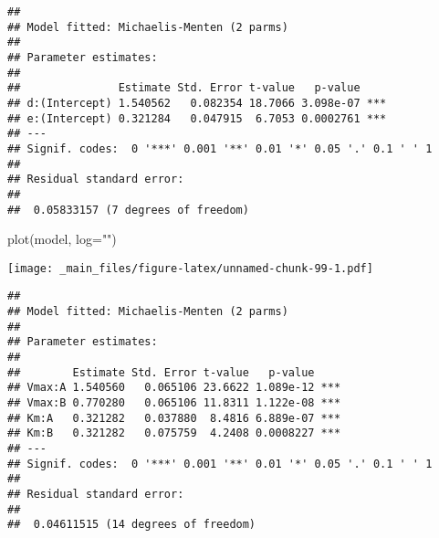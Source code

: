 \documentclass[
]{book}
\newenvironment{Shaded}{\begin{snugshade}}{\end{snugshade}}
\newcommand{\AttributeTok}[1]{\textcolor[rgb]{0.77,0.63,0.00}{#1}}
\newcommand{\CommentTok}[1]{\textcolor[rgb]{0.56,0.35,0.01}{\textit{#1}}}
\newcommand{\DecValTok}[1]{\textcolor[rgb]{0.00,0.00,0.81}{#1}}
\newcommand{\FunctionTok}[1]{\textcolor[rgb]{0.00,0.00,0.00}{#1}}
\newcommand{\NormalTok}[1]{#1}
\newcommand{\OtherTok}[1]{\textcolor[rgb]{0.56,0.35,0.01}{#1}}
\newcommand{\SpecialCharTok}[1]{\textcolor[rgb]{0.00,0.00,0.00}{#1}}
\newcommand{\StringTok}[1]{\textcolor[rgb]{0.31,0.60,0.02}{#1}}
\begin{document}
\begin{verbatim}
## 
## Model fitted: Michaelis-Menten (2 parms)
## 
## Parameter estimates:
## 
##               Estimate Std. Error t-value   p-value    
## d:(Intercept) 1.540562   0.082354 18.7066 3.098e-07 ***
## e:(Intercept) 0.321284   0.047915  6.7053 0.0002761 ***
## ---
## Signif. codes:  0 '***' 0.001 '**' 0.01 '*' 0.05 '.' 0.1 ' ' 1
## 
## Residual standard error:
## 
##  0.05833157 (7 degrees of freedom)
\end{verbatim}

\begin{Shaded}
\begin{Highlighting}[]
\FunctionTok{plot}\NormalTok{(model, }\AttributeTok{log=}\StringTok{""}\NormalTok{)}
\end{Highlighting}
\end{Shaded}

\texttt{[image: \_main\_files/figure-latex/unnamed-chunk-99-1.pdf]}

\begin{Shaded}
\end{Shaded}

\begin{verbatim}
## 
## Model fitted: Michaelis-Menten (2 parms)
## 
## Parameter estimates:
## 
##        Estimate Std. Error t-value   p-value    
## Vmax:A 1.540560   0.065106 23.6622 1.089e-12 ***
## Vmax:B 0.770280   0.065106 11.8311 1.122e-08 ***
## Km:A   0.321282   0.037880  8.4816 6.889e-07 ***
## Km:B   0.321282   0.075759  4.2408 0.0008227 ***
## ---
## Signif. codes:  0 '***' 0.001 '**' 0.01 '*' 0.05 '.' 0.1 ' ' 1
## 
## Residual standard error:
## 
##  0.04611515 (14 degrees of freedom)
\end{verbatim}
\end{document}
